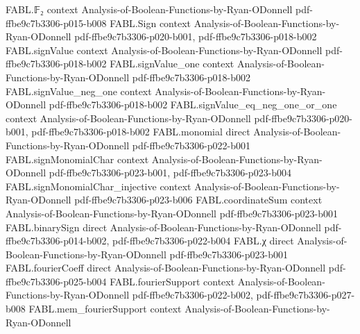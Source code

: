 \begin{theorem}
\label{FABL.exists_levelOneInequality_constant}
\leanok
{}
\proofstep
  {FABL.𝔽₂}
  {context}
  {Analysis-of-Boolean-Functions-by-Ryan-ODonnell}
  {pdf-ffbe9c7b3306-p015-b008}
\proofstep
  {FABL.Sign}
  {context}
  {Analysis-of-Boolean-Functions-by-Ryan-ODonnell}
  {pdf-ffbe9c7b3306-p020-b001,
    pdf-ffbe9c7b3306-p018-b002}
\proofstep
  {FABL.signValue}
  {context}
  {Analysis-of-Boolean-Functions-by-Ryan-ODonnell}
  {pdf-ffbe9c7b3306-p018-b002}
\proofstep
  {FABL.signValue_one}
  {context}
  {Analysis-of-Boolean-Functions-by-Ryan-ODonnell}
  {pdf-ffbe9c7b3306-p018-b002}
\proofstep
  {FABL.signValue_neg_one}
  {context}
  {Analysis-of-Boolean-Functions-by-Ryan-ODonnell}
  {pdf-ffbe9c7b3306-p018-b002}
\proofstep
  {FABL.signValue_eq_neg_one_or_one}
  {context}
  {Analysis-of-Boolean-Functions-by-Ryan-ODonnell}
  {pdf-ffbe9c7b3306-p020-b001,
    pdf-ffbe9c7b3306-p018-b002}
\proofstep
  {FABL.monomial}
  {direct}
  {Analysis-of-Boolean-Functions-by-Ryan-ODonnell}
  {pdf-ffbe9c7b3306-p022-b001}
\proofstep
  {FABL.signMonomialChar}
  {context}
  {Analysis-of-Boolean-Functions-by-Ryan-ODonnell}
  {pdf-ffbe9c7b3306-p023-b001,
    pdf-ffbe9c7b3306-p023-b004}
\proofstep
  {FABL.signMonomialChar_injective}
  {context}
  {Analysis-of-Boolean-Functions-by-Ryan-ODonnell}
  {pdf-ffbe9c7b3306-p023-b006}
\proofstep
  {FABL.coordinateSum}
  {context}
  {Analysis-of-Boolean-Functions-by-Ryan-ODonnell}
  {pdf-ffbe9c7b3306-p023-b001}
\proofstep
  {FABL.binarySign}
  {direct}
  {Analysis-of-Boolean-Functions-by-Ryan-ODonnell}
  {pdf-ffbe9c7b3306-p014-b002,
    pdf-ffbe9c7b3306-p022-b004}
\proofstep
  {FABL.χ}
  {direct}
  {Analysis-of-Boolean-Functions-by-Ryan-ODonnell}
  {pdf-ffbe9c7b3306-p023-b001}
\proofstep
  {FABL.fourierCoeff}
  {direct}
  {Analysis-of-Boolean-Functions-by-Ryan-ODonnell}
  {pdf-ffbe9c7b3306-p025-b004}
\proofstep
  {FABL.fourierSupport}
  {context}
  {Analysis-of-Boolean-Functions-by-Ryan-ODonnell}
  {pdf-ffbe9c7b3306-p022-b002,
    pdf-ffbe9c7b3306-p027-b008}
\proofstep
  {FABL.mem_fourierSupport}
  {context}
  {Analysis-of-Boolean-Functions-by-Ryan-ODonnell}

\end{theorem}

